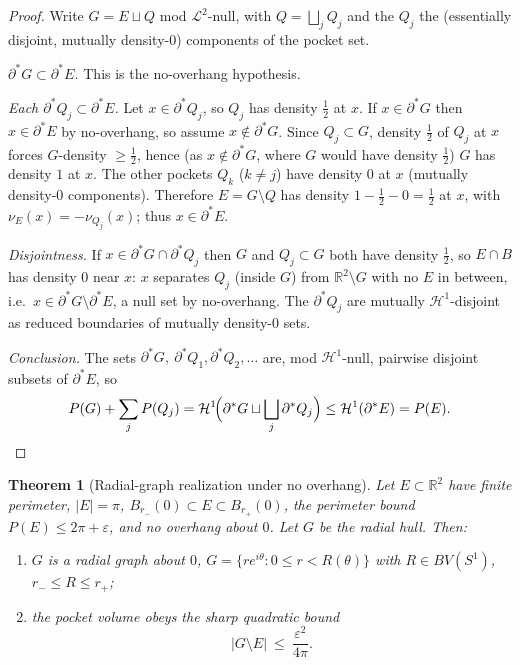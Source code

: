 \documentclass[11pt]{article}
\newtheorem{theorem}{Theorem}
\theoremstyle{definition}
\newcommand{\R}{\mathbb R}
\newcommand{\HH}{\mathcal H}
\newcommand{\eps}{\varepsilon}
\newcommand{\abs}[1]{\left|#1\right|}
\begin{document}
\begin{proof}
Write $G=E\sqcup Q$ mod $\mathcal L^2$-null, with $Q=\bigsqcup_jQ_j$ and
the $Q_j$ the (essentially disjoint, mutually density-$0$) components of
the pocket set.

\emph{$\partial^*G\subset\partial^*E$.} This is the no-overhang
hypothesis.

\emph{Each $\partial^*Q_j\subset\partial^*E$.} Let $x\in\partial^*Q_j$, so
$Q_j$ has density $\tfrac12$ at $x$. If $x\in\partial^*G$ then
$x\in\partial^*E$ by no-overhang, so assume $x\notin\partial^*G$. Since
$Q_j\subset G$, density $\tfrac12$ of $Q_j$ at $x$ forces $G$-density
$\ge\tfrac12$, hence (as $x\notin\partial^*G$, where $G$ would have density
$\tfrac12$) $G$ has density $1$ at $x$. The other pockets $Q_k$ ($k\ne j$)
have density $0$ at $x$ (mutually density-$0$ components). Therefore
$E=G\setminus Q$ has density $1-\tfrac12-0=\tfrac12$ at $x$, with
$\nu_E(x)=-\nu_{Q_j}(x)$; thus $x\in\partial^*E$.

\emph{Disjointness.} If $x\in\partial^*G\cap\partial^*Q_j$ then $G$ and
$Q_j\subset G$ both have density $\tfrac12$, so $E\cap B$ has density $0$
near $x$: $x$ separates $Q_j$ (inside $G$) from $\R^2\setminus G$ with no
$E$ in between, i.e.\ $x\in\partial^*G\setminus\partial^*E$, a null set by
no-overhang. The $\partial^*Q_j$ are mutually $\HH^1$-disjoint as reduced
boundaries of mutually density-$0$ sets.

\emph{Conclusion.} The sets $\partial^*G,\ \partial^*Q_1,\partial^*Q_2,
\dots$ are, mod $\HH^1$-null, pairwise disjoint subsets of $\partial^*E$,
so
\[
   P(G)+\sum_jP(Q_j)
   =\HH^1\!\Big(\partial^*G\sqcup\bigsqcup_j\partial^*Q_j\Big)
   \le\HH^1(\partial^*E)=P(E). \qedhere
\]
\end{proof}

\begin{theorem}[Radial-graph realization under no overhang]\label{thm:realize}
Let $E\subset\R^2$ have finite perimeter, $|E|=\pi$,
$B_{r_-}(0)\subset E\subset B_{r_+}(0)$, the perimeter bound $P(E)\le
2\pi+\eps$, and \emph{no overhang} about $0$. Let $G$ be the radial hull.
Then:
\begin{enumerate}[label=\textup{(\roman*)}]
\item $G$ is a radial graph about $0$, $G=\{re^{i\theta}:0\le r<R(\theta)\}$
with $R\in BV(S^1)$, $r_-\le R\le r_+$;
\item the pocket volume obeys the sharp quadratic bound
\begin{equation}\label{eq:pocket}
   \abs{G\setminus E}\ \le\ \frac{\eps^2}{4\pi}.
\end{equation}
\end{enumerate}
\end{theorem}
\end{document}
